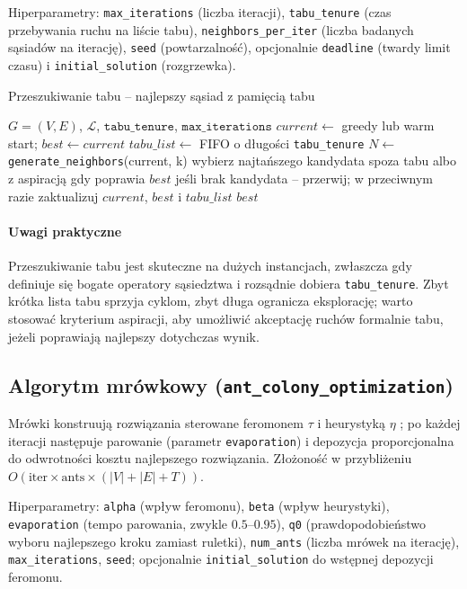 Hiperparametry: \texttt{max\_iterations} (liczba iteracji), \texttt{tabu\_tenure} (czas przebywania ruchu na liście tabu), \texttt{neighbors\_per\_iter} (liczba badanych sąsiadów na iterację), \texttt{seed} (powtarzalność), opcjonalnie \texttt{deadline} (twardy limit czasu) i \texttt{initial\_solution} (rozgrzewka).

\begin{algorithm}[H]
\caption{Przeszukiwanie tabu – najlepszy sąsiad z pamięcią tabu}
\label{alg:tabu}
\begin{algorithmic}[1]
\Require $G=(V,E)$, $\mathcal{L}$, $\texttt{tabu\_tenure}$, $\texttt{max\_iterations}$
\State $current\gets$ greedy lub warm start; $best\gets current$
\State $tabu\_list\gets$ FIFO o długości \texttt{tabu\_tenure}
  \State $N\gets$ \texttt{generate\_neighbors}(current, k)
  \State wybierz najtańszego kandydata spoza tabu albo z aspiracją gdy poprawia $best$
  \State jeśli brak kandydata – przerwij; w przeciwnym razie zaktualizuj $current$, $best$ i $tabu\_list$
\EndFor
\State \Return $best$
\end{algorithmic}
\end{algorithm}

\paragraph{Uwagi praktyczne}
Przeszukiwanie tabu jest skuteczne na dużych instancjach, zwłaszcza gdy definiuje się bogate operatory sąsiedztwa i rozsądnie dobiera \texttt{tabu\_tenure}. Zbyt krótka lista tabu sprzyja cyklom, zbyt długa ogranicza eksplorację; warto stosować kryterium aspiracji, aby umożliwić akceptację ruchów formalnie tabu, jeżeli poprawiają najlepszy dotychczas wynik.

\subsection{Algorytm mrówkowy (\texttt{ant\_colony\_optimization})}\label{subsec:aco}
Mrówki konstruują rozwiązania sterowane feromonem \(\tau\) i heurystyką \(\eta\) \cite{dorigo1997}; po każdej iteracji następuje parowanie (parametr \texttt{evaporation}) i depozycja proporcjonalna do odwrotności kosztu najlepszego rozwiązania. Złożoność w przybliżeniu \(O(\text{iter}\times\text{ants}\times(|V|+|E|+T))\).

Hiperparametry: \texttt{alpha} (wpływ feromonu), \texttt{beta} (wpływ heurystyki), \texttt{evaporation} (tempo parowania, zwykle \(0{.}5\text{–}0{.}95\)), \texttt{q0} (prawdopodobieństwo wyboru najlepszego kroku zamiast ruletki), \texttt{num\_ants} (liczba mrówek na iterację), \texttt{max\_iterations}, \texttt{seed}; opcjonalnie \texttt{initial\_solution} do wstępnej depozycji feromonu.

